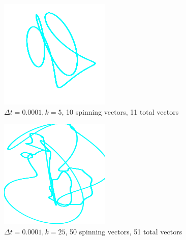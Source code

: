 \documentclass[letterpaper, 12pt]{article}
\begin{document}
\begin{paracol}{3}
    \begin{figure}[H]
        \centering
        \includegraphics[width=\linewidth]{5.png}
        \caption{\protect\(\Delta t = 0.0001, k = 5\), 10 spinning vectors, 11 total vectors}
    \end{figure}
    \switchcolumn

    \begin{figure}[H]
        \centering
        \includegraphics[width=\linewidth]{25.png}
        \caption{\protect\(\Delta t = 0.0001, k = 25\), 50 spinning vectors, 51 total vectors}
    \end{figure}
    \switchcolumn


\end{paracol}
\end{document}
